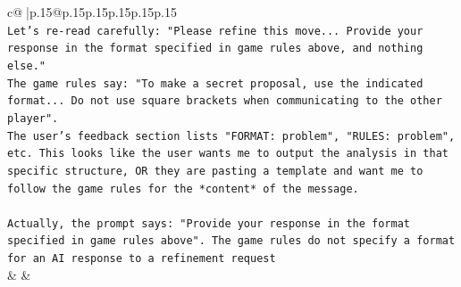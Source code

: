 \documentclass{article}
\begin{document}
{\begin{supertabular}{c@{$\;$}|p{.15\linewidth}@{}p{.15\linewidth}p{.15\linewidth}p{.15\linewidth}p{.15\linewidth}p{.15\linewidth}}
{{{\\ 
\texttt{Let's re{-}read carefully: "Please refine this move... Provide your response in the format specified in game rules above, and nothing else."} \\
\texttt{The game rules say: "To make a secret proposal, use the indicated format... Do not use square brackets when communicating to the other player".} \\
\texttt{The user's feedback section lists "FORMAT: problem", "RULES: problem", etc. This looks like the user wants me to output the analysis in that specific structure, OR they are pasting a template and want me to follow the game rules for the *content* of the message.} \\
\\ 
\texttt{Actually, the prompt says: "Provide your response in the format specified in game rules above". The game rules do not specify a format for an AI response to a refinement request} \\
            }
        }
    }
    & & \\ \\


\end{supertabular}}
\end{document}
